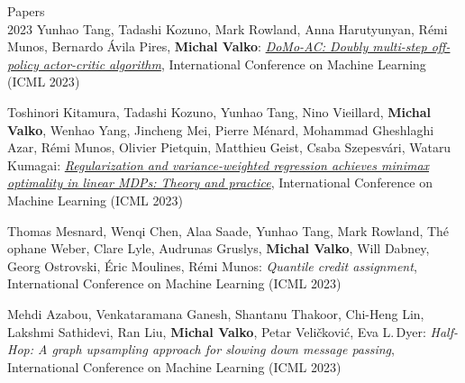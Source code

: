 \documentclass{resume}
\begin{document}
\begin{category}{Papers\\2023}
\citembullet
Yunhao Tang, Tadashi Kozuno, Mark Rowland, Anna Harutyunyan, R\' emi Munos, Bernardo \'Avila  Pires,   {\bf Michal Valko}: 
\href{https://arxiv.org/pdf/2305.18501.pdf}
{\emph{DoMo-AC: Doubly multi-step off-policy actor-critic algorithm}}, 
International Conference on Machine Learning
({\sf ICML 2023}) 


\citembullet
Toshinori Kitamura, Tadashi Kozuno, Yunhao Tang, Nino Vieillard,  {\bf Michal Valko}, Wenhao Yang, Jincheng Mei, Pierre M\' enard, Mohammad Gheshlaghi Azar,  R\' emi  Munos, Olivier Pietquin, Matthieu Geist, Csaba Szepesv\' ari, Wataru Kumagai: 
\href{https://arxiv.org/pdf/2305.13185.pdf}
{\emph{Regularization and variance-weighted regression achieves minimax optimality in linear MDPs: Theory and practice}},
International Conference on Machine Learning
({\sf ICML 2023}) 


\citembullet
Thomas Mesnard, Wenqi Chen, Alaa Saade, Yunhao Tang, Mark Rowland, Th\'e ophane Weber, Clare Lyle, Audrunas Gruslys,  {\bf Michal Valko}, Will Dabney, Georg Ostrovski, \' Eric Moulines, R\' emi  Munos: 
{\emph{Quantile credit assignment}}, 
International Conference on Machine Learning
({\sf ICML 2023}) 

\citembullet
Mehdi Azabou, Venkataramana Ganesh, Shantanu Thakoor, Chi-Heng Lin, Lakshmi Sathidevi, Ran Liu,  {\bf Michal Valko}, Petar Veličkovi\' c, Eva L.\,Dyer: 
{\emph{Half-Hop: A graph upsampling approach for slowing down message passing}}, 
International Conference on Machine Learning
({\sf ICML 2023}) 
\end{category}
\end{document}
